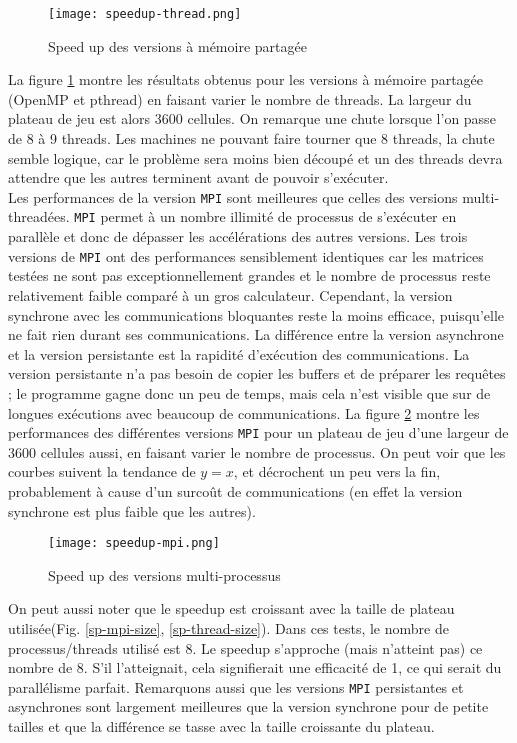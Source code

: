 \begin{figure}[!ht]
\centering
\texttt{[image: speedup-thread.png]}
\caption{Speed up des versions à mémoire partagée}
\label{fig:sp-thread}
\end{figure}

La figure \ref{fig:sp-thread} montre les résultats obtenus pour les versions à mémoire partagée (OpenMP et pthread) en faisant varier le nombre de threads. La largeur du plateau de jeu est alors 3600 cellules.
On remarque une chute lorsque l'on passe de 8 à 9 threads. Les machines ne pouvant faire tourner que 8 threads, la chute semble logique, car le problème sera moins bien découpé et un des threads devra attendre que les autres terminent avant de pouvoir s'exécuter.\\

Les performances de la version \texttt{MPI} sont meilleures que celles des versions multi-threadées. \texttt{MPI} permet à un nombre illimité de processus de s'exécuter en parallèle et donc de dépasser les accélérations des autres versions. Les trois versions de \texttt{MPI} ont des performances sensiblement identiques car les matrices testées ne sont pas exceptionnellement grandes et le nombre de processus reste relativement faible comparé à un gros calculateur. Cependant, la version synchrone avec les communications bloquantes reste la moins efficace, puisqu'elle ne fait rien durant ses communications. La différence entre la version asynchrone et la version persistante est la rapidité d'exécution des communications. La version persistante n'a pas besoin de copier les buffers et de préparer les requêtes ; le programme gagne donc un peu de temps, mais cela n'est visible que sur de longues exécutions avec beaucoup de communications.
La figure \ref{fig:sp-proc} montre les performances des différentes versions \texttt{MPI} pour un plateau de jeu d'une largeur de 3600 cellules aussi, en faisant varier le nombre de processus. On peut voir que les courbes suivent la tendance de $y=x$, et décrochent un peu vers la fin, probablement à cause d'un surcoût de communications (en effet la version synchrone est plus faible que les autres).

\begin{figure}[H]
\centering
\texttt{[image: speedup-mpi.png]}
\caption{Speed up des versions multi-processus}
\label{fig:sp-proc}
\end{figure}

On peut aussi noter que le speedup est croissant avec la taille de plateau utilisée(Fig. \ref{sp-mpi-size}, \ref{sp-thread-size}). Dans ces tests, le nombre de processus/threads utilisé est 8. Le speedup s'approche (mais n'atteint pas) ce nombre de 8. S'il l'atteignait, cela signifierait une efficacité de 1, ce qui serait du parallélisme parfait. Remarquons aussi que les versions \texttt{MPI} persistantes et asynchrones sont largement meilleures que la version synchrone pour de petite tailles et que la différence se tasse avec la taille croissante du plateau. 

